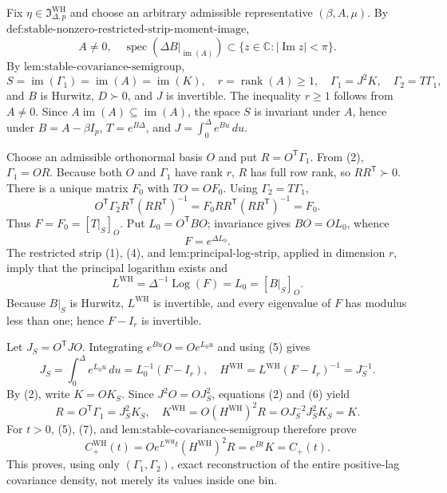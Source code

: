 Fix \(\eta\in\mathfrak I_{\Delta,p}^{\mathrm{WH}}\) and choose an arbitrary admissible representative \((\beta,A,\mu)\).  By \(\text{def:stable-nonzero-restricted-strip-moment-image}\),
\[
 A\neq0,\quad
 \operatorname{spec}\!\left(\left.\Delta B\right|_{\operatorname{im}(A)}\right)
 \subset\{z\in\mathbb C:|\operatorname{Im}z|<\pi\}.
\tag{1}
\]
By \(\text{lem:stable-covariance-semigroup}\),
\[
 S=\operatorname{im}(\Gamma_1)=\operatorname{im}(A)=\operatorname{im}(K),\quad
 r=\operatorname{rank}(A)\geq1,\quad
 \Gamma_1=J^2K,\quad \Gamma_2=T\Gamma_1,
\tag{2}
\]
and \(B\) is Hurwitz, \(D\succ0\), and \(J\) is invertible.  The inequality \(r\geq1\) follows from \(A\neq0\).  Since \(A\operatorname{im}(A)\subseteq\operatorname{im}(A)\), the space \(S\) is invariant under \(A\), hence under \(B=A-\beta I_p\), \(T=e^{B\Delta}\), and \(J=\int_0^\Delta e^{Bu}\,du\).

Choose an admissible orthonormal basis \(O\) and put \(R=O^{\mathsf T}\Gamma_1\).  From (2), \(\Gamma_1=OR\).  Because both \(O\) and \(\Gamma_1\) have rank \(r\), \(R\) has full row rank, so \(RR^{\mathsf T}\succ0\).  There is a unique matrix \(F_0\) with \(TO=OF_0\).  Using \(\Gamma_2=T\Gamma_1\),
\[
 O^{\mathsf T}\Gamma_2R^{\mathsf T}(RR^{\mathsf T})^{-1}
 =F_0RR^{\mathsf T}(RR^{\mathsf T})^{-1}=F_0.
\tag{3}
\]
Thus \(F=F_0=[T|_S]_O\).  Put \(L_0=O^{\mathsf T}BO\); invariance gives \(BO=OL_0\), whence
\[
 F=e^{\Delta L_0}.
\tag{4}
\]
The restricted strip (1), (4), and \(\text{lem:principal-log-strip}\), applied in dimension \(r\), imply that the principal logarithm exists and
\[
 L^{\mathrm{WH}}=\Delta^{-1}\operatorname{Log}(F)=L_0=[B|_S]_O.
\tag{5}
\]
Because \(B|_S\) is Hurwitz, \(L^{\mathrm{WH}}\) is invertible, and every eigenvalue of \(F\) has modulus less than one; hence \(F-I_r\) is invertible.

Let \(J_S=O^{\mathsf T}JO\).  Integrating \(e^{Bu}O=Oe^{L_0u}\) and using (5) gives
\[
 J_S=\int_0^\Delta e^{L_0u}\,du
 =L_0^{-1}(F-I_r),\quad
 H^{\mathrm{WH}}=L^{\mathrm{WH}}(F-I_r)^{-1}=J_S^{-1}.
\tag{6}
\]
By (2), write \(K=OK_S\).  Since \(J^2O=OJ_S^2\), equations (2) and (6) yield
\[
 R=O^{\mathsf T}\Gamma_1=J_S^2K_S,\quad
 K^{\mathrm{WH}}=O(H^{\mathrm{WH}})^2R
 =OJ_S^{-2}J_S^2K_S=K.
\tag{7}
\]
For \(t>0\), (5), (7), and \(\text{lem:stable-covariance-semigroup}\) therefore prove
\[
 C_{+}^{\mathrm{WH}}(t)
 =Oe^{L^{\mathrm{WH}}t}(H^{\mathrm{WH}})^2R
 =e^{Bt}K=C_{+}(t).
\tag{8}
\]
This proves, using only \((\Gamma_1,\Gamma_2)\), exact reconstruction of the entire positive-lag covariance density, not merely its values inside one bin.

